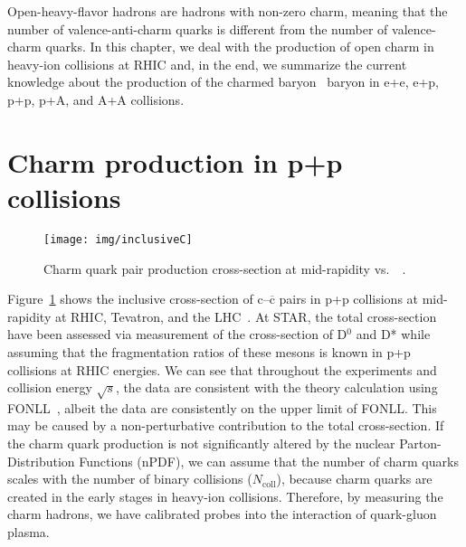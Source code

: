 Open-heavy-flavor hadrons are hadrons with non-zero charm, meaning that the number of valence-anti-charm quarks is different from the number of valence-charm quarks. In this chapter, we deal with the production of open charm in heavy-ion collisions at RHIC and, in the end, we summarize the current knowledge about the production of the charmed baryon \Lambdac\ baryon in e+e, e+p, p+p, p+A, and A+A collisions.

\section{Charm production in p+p collisions}

\begin{figure}[!htb]
\centering
\texttt{[image: img/inclusiveC]}
\caption{Charm quark pair production cross-section at mid-rapidity vs.\ \pt~\cite{FONLLcharm,GuannanQM15,ALICEcharm,CDFcharm,pp500GeVcharm,pp200GeVcharm}.}
\label{fig:inclusiveC}
\end{figure}

Figure~\ref{fig:inclusiveC} shows the inclusive cross-section of c--$\overline{\mathrm{c}}$ pairs in p+p collisions at mid-rapidity at RHIC, Tevatron, and the LHC~\cite{GuannanQM15,ALICEcharm,CDFcharm,pp500GeVcharm,pp200GeVcharm}\@. At STAR, the total cross-section have been assessed via measurement of the cross-section of D$^0$ and D* while assuming that the fragmentation ratios of these mesons is known in p+p collisions at RHIC energies. We can see that throughout the experiments and collision energy $\sqrt{s}$, the data are consistent with the theory calculation using FONLL~\cite{FONLLcharm}, albeit the data are consistently on the upper limit of FONLL\@. This may be caused by a non-perturbative contribution to the total cross-section. If the charm quark production is not significantly altered by the nuclear Parton-Distribution Functions (nPDF), we can assume that the number of charm quarks scales with the number of binary collisions ($N_\mathrm{coll}$), because charm quarks are created in the early stages in heavy-ion collisions. Therefore, by measuring the charm hadrons, we have calibrated probes into the interaction of quark-gluon plasma.

